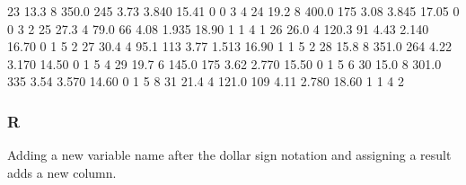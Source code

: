 \documentclass[
]{book}
\newenvironment{Shaded}{\begin{snugshade}}{\end{snugshade}}
\newcommand{\CommentTok}[1]{\textcolor[rgb]{0.56,0.35,0.01}{\textit{#1}}}
\newcommand{\DecValTok}[1]{\textcolor[rgb]{0.00,0.00,0.81}{#1}}
\newcommand{\ErrorTok}[1]{\textcolor[rgb]{0.64,0.00,0.00}{\textbf{#1}}}
\newcommand{\FloatTok}[1]{\textcolor[rgb]{0.00,0.00,0.81}{#1}}
\newcommand{\NormalTok}[1]{#1}
\newcommand{\OtherTok}[1]{\textcolor[rgb]{0.56,0.35,0.01}{#1}}
\newcommand{\SpecialCharTok}[1]{\textcolor[rgb]{0.00,0.00,0.00}{#1}}
\begin{document}
\begin{Shaded}
\begin{Highlighting}[]
\DecValTok{23}  \FloatTok{13.3}    \DecValTok{8}  \FloatTok{350.0}  \DecValTok{245}        \FloatTok{3.73}  \FloatTok{3.840}  \FloatTok{15.41}   \DecValTok{0}   \DecValTok{0}     \DecValTok{3}     \DecValTok{4}
\DecValTok{24}  \FloatTok{19.2}    \DecValTok{8}  \FloatTok{400.0}  \DecValTok{175}        \FloatTok{3.08}  \FloatTok{3.845}  \FloatTok{17.05}   \DecValTok{0}   \DecValTok{0}     \DecValTok{3}     \DecValTok{2}
\DecValTok{25}  \FloatTok{27.3}    \DecValTok{4}   \FloatTok{79.0}   \DecValTok{66}        \FloatTok{4.08}  \FloatTok{1.935}  \FloatTok{18.90}   \DecValTok{1}   \DecValTok{1}     \DecValTok{4}     \DecValTok{1}
\DecValTok{26}  \FloatTok{26.0}    \DecValTok{4}  \FloatTok{120.3}   \DecValTok{91}        \FloatTok{4.43}  \FloatTok{2.140}  \FloatTok{16.70}   \DecValTok{0}   \DecValTok{1}     \DecValTok{5}     \DecValTok{2}
\DecValTok{27}  \FloatTok{30.4}    \DecValTok{4}   \FloatTok{95.1}  \DecValTok{113}        \FloatTok{3.77}  \FloatTok{1.513}  \FloatTok{16.90}   \DecValTok{1}   \DecValTok{1}     \DecValTok{5}     \DecValTok{2}
\DecValTok{28}  \FloatTok{15.8}    \DecValTok{8}  \FloatTok{351.0}  \DecValTok{264}        \FloatTok{4.22}  \FloatTok{3.170}  \FloatTok{14.50}   \DecValTok{0}   \DecValTok{1}     \DecValTok{5}     \DecValTok{4}
\DecValTok{29}  \FloatTok{19.7}    \DecValTok{6}  \FloatTok{145.0}  \DecValTok{175}        \FloatTok{3.62}  \FloatTok{2.770}  \FloatTok{15.50}   \DecValTok{0}   \DecValTok{1}     \DecValTok{5}     \DecValTok{6}
\DecValTok{30}  \FloatTok{15.0}    \DecValTok{8}  \FloatTok{301.0}  \DecValTok{335}        \FloatTok{3.54}  \FloatTok{3.570}  \FloatTok{14.60}   \DecValTok{0}   \DecValTok{1}     \DecValTok{5}     \DecValTok{8}
\DecValTok{31}  \FloatTok{21.4}    \DecValTok{4}  \FloatTok{121.0}  \DecValTok{109}        \FloatTok{4.11}  \FloatTok{2.780}  \FloatTok{18.60}   \DecValTok{1}   \DecValTok{1}     \DecValTok{4}     \DecValTok{2}
\end{Highlighting}
\end{Shaded}

\hypertarget{r-21}{%
\subsubsection*{R}\label{r-21}}

Adding a new variable name after the dollar sign notation and assigning a result adds a new column.

\begin{Shaded}
\end{Shaded}
\end{document}
